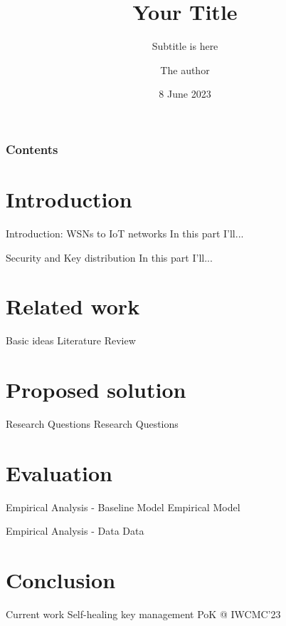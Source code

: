 \documentclass[pdf]{beamer}
\title{Your Title}
\subtitle{ Subtitle is here}  %
\author{The author} %
\institute{Maître de conférences\\
Laboratoire ERIC UR 3083}
\date[\textcolor{white}{8 June 2023}]  %
{8 June 2023}
\begin{document}
\frame{\titlepage}
\begin{frame}
\frametitle{Contents}
\tableofcontents
\end{frame}
\section{Introduction}
    \begin{frame}{Introduction: WSNs to IoT networks}
 In this part I'll...
    \end{frame}

    \begin{frame}{Security and Key distribution }
 In this part I'll...
    \end{frame}

\section{Related work}
    \begin{frame}{Basic ideas}
	Literature Review
    \end{frame}


\section{Proposed solution}
    \begin{frame}{Research Questions}
        Research Questions
    \end{frame}


\section{Evaluation}
    \begin{frame}{Empirical Analysis - Baseline Model}
	Empirical Model
    \end{frame}

    \begin{frame}{Empirical Analysis - Data}
	Data
    \end{frame}


\section{Conclusion}
    \begin{frame}{Current work}
	Self-healing key management 
    PoK @ IWCMC'23
    \end{frame}
\end{document}
